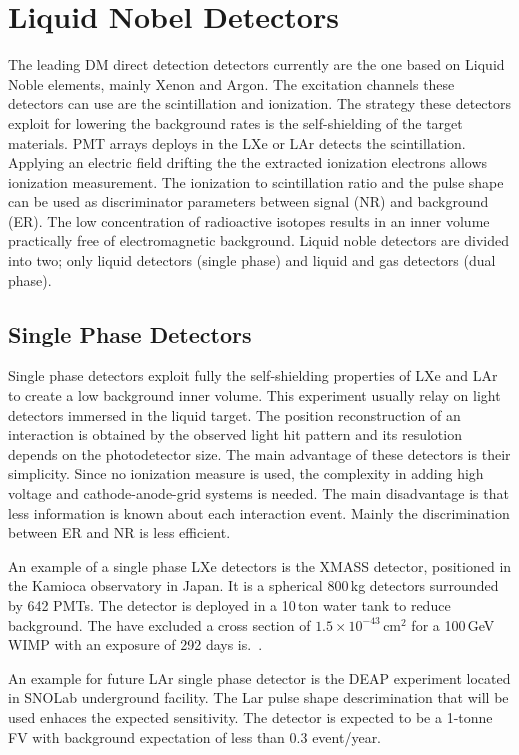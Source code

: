 \section{Liquid Nobel Detectors}
\label{sec:liquidDet}

The leading DM direct detection detectors currently are the one based on Liquid Noble elements, mainly Xenon and Argon. The excitation channels these detectors can use are the scintillation and ionization. The strategy these detectors exploit for lowering the background rates is the self-shielding of the target materials. PMT arrays deploys in the LXe or LAr detects the scintillation. Applying an electric field drifting the the extracted ionization electrons  allows ionization measurement. The ionization to scintillation ratio and the pulse shape can be used as discriminator parameters between signal (NR) and background (ER). The low concentration of radioactive isotopes results in an inner volume practically free of electromagnetic background. Liquid noble detectors are divided into two; only liquid detectors (single phase) and liquid and gas detectors (dual phase).

\subsection{Single Phase Detectors}
\label{sec:singlePhase}
 
Single phase detectors exploit fully the self-shielding properties of LXe and LAr to create a low background inner volume. This experiment usually relay on light detectors immersed in the liquid target. The position reconstruction of an interaction is obtained by the observed light hit pattern and its resulotion depends on the photodetector size. The main advantage of these detectors is their simplicity. Since no ionization measure is used, the complexity in adding high voltage and cathode-anode-grid systems is needed. The main disadvantage is that less information is known about each interaction event. Mainly the discrimination between ER and NR is less efficient. 

An example of a single phase LXe detectors is the XMASS detector, positioned in the Kamioca observatory in Japan. It is a spherical 800\,kg detectors surrounded by 642 PMTs. The detector is deployed in a 10\,ton water tank to reduce background. The have excluded a cross section of $1.5\times 10^{-43}$\,cm$^2$ for a 100\,GeV WIMP with an exposure of 292 days is.~\cite{Hiraide:2016ryf}.

An example for future LAr single phase detector is the DEAP experiment located in SNOLab underground facility. The Lar pulse shape descrimination that will be used enhaces the expected sensitivity. The detector is expected to be a 1-tonne FV with background expectation of less than $0.3$ event/year. 
 
